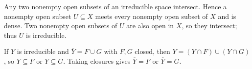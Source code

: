 Any two nonempty open subsets of an irreducible space intersect. Hence a nonempty open subset $U\subseteq X$ meets every nonempty open subset of $X$ and is dense. Two nonempty open subsets of $U$ are also open in $X$, so they intersect; thus $U$ is irreducible.

If $Y$ is irreducible and $\overline Y=F\cup G$ with $F,G$ closed, then $Y=(Y\cap F)\cup(Y\cap G)$, so $Y\subseteq F$ or $Y\subseteq G$. Taking closures gives $\overline Y=F$ or $\overline Y=G$.
